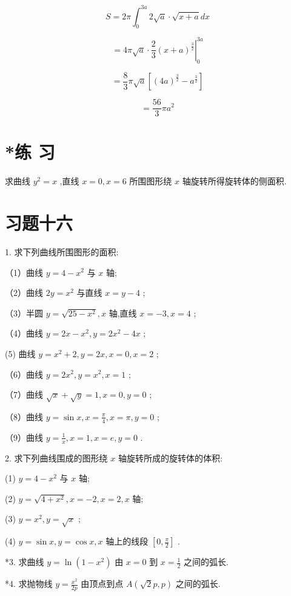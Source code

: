 \documentclass[10pt]{article}
\begin{document}
\[
S = {2\pi }{\int }_{0}^{3a}2\sqrt{a} \cdot \sqrt{x + a}{dx}
\]

\[
= {\left. 4\pi \sqrt{a} \cdot \frac{2}{3}{\left( x + a\right) }^{\frac{3}{2}}\right| }_{0}^{3a}
\]

\[
= \frac{8}{3}\pi \sqrt{a}\left\lbrack {{\left( 4a\right) }^{\frac{3}{2}} - {a}^{\frac{3}{2}}}\right\rbrack
\]

\[
= \frac{56}{3}\pi {a}^{2}
\]

\section*{*练 习}

求曲线 \({y}^{2} = x\) ,直线 \(x = 0,x = 6\) 所围图形绕 \(x\) 轴旋转所得旋转体的侧面积.

\section*{习题十六}

1. 求下列曲线所围图形的面积:

（1）曲线 \(y = 4 - {x}^{2}\) 与 \(x\) 轴;

（2）曲线 \({2y} = {x}^{2}\) 与直线 \(x = y - 4\) ;

（3）半圆 \(y = \sqrt{{25} - {x}^{2}},x\) 轴,直线 \(x = - 3,x = 4\) ;

（4）曲线 \(y = {2x} - {x}^{2},y = 2{x}^{2} - {4x}\) ;

(5) 曲线 \(y = {x}^{2} + 2,y = {2x},x = 0,x = 2\) ;

（6）曲线 \(y = 2{x}^{2},y = {x}^{2},x = 1\) ;

（7）曲线 \(\sqrt{x} + \sqrt{y} = 1,x = 0,y = 0\) ;

（8）曲线 \(y = \sin x,x = \frac{\pi }{4},x = \pi ,y = 0\) ;

（9）曲线 \(y = \frac{1}{x},x = 1,x = e,y = 0\) .

2. 求下列曲线围成的图形绕 \(x\) 轴旋转所成的旋转体的体积:

(1) \(y = 4 - {x}^{2}\) 与 \(x\) 轴;

(2) \(y = \sqrt{4 + {x}^{2}},x = - 2,x = 2,x\) 轴;

(3) \(y = {x}^{2},y = \sqrt{x}\) ;

(4) \(y = \sin x,y = \cos x,x\) 轴上的线段 \(\left\lbrack {0,\frac{\pi }{2}}\right\rbrack\) .

*3. 求曲线 \(y = \ln \left( {1 - {x}^{2}}\right)\) 由 \(x = 0\) 到 \(x = \frac{1}{2}\) 之间的弧长.

*4. 求抛物线 \(y = \frac{{x}^{2}}{2p}\) 由顶点到点 \(A\left( {\sqrt{2}p,p}\right)\) 之间的弧长.
\end{document}
